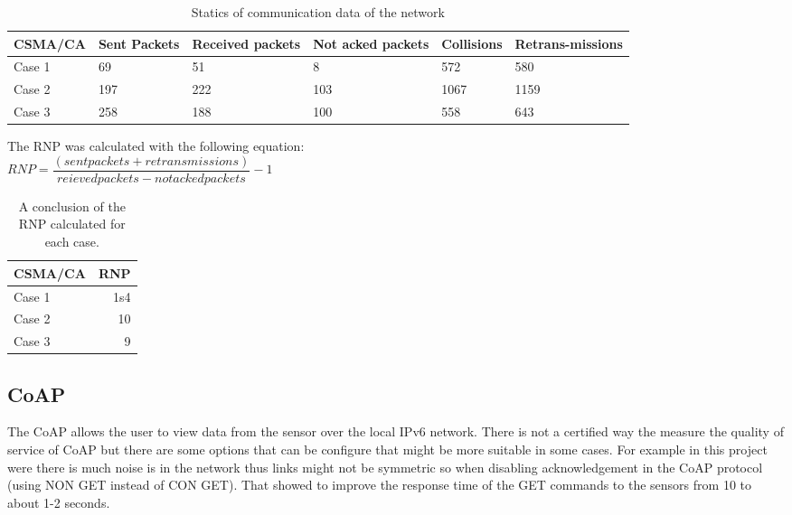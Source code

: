 \begin{table}[htbp]
	\caption{Statics of communication data of the network}
	\label{qos}
	\begin{center}
		\begin{tabular}{p{1cm}p{.9cm}p{1cm}p{1.2cm}p{1cm}p{1cm}}
			\hline
			CSMA/CA& Sent Packets & Received packets & Not acked packets & Collisions & Retrans-missions \\ \hline
			Case 1 & 69 & 51 & 8 & 572&580 \\ 
			Case 2 & 197 & 222 & 103 & 1067&1159 \\ 
			Case 3 & 258 & 188 & 100 & 558&643 \\ \hline
		\end{tabular}
	\end{center}
	
\end{table}
The RNP was calculated with the following equation:\\

$RNP = \dfrac{ (sent packets + retransmissions)}{reieved packets - not acked packets} -1 $

\begin{table}[htbp]
	\caption{A conclusion of the RNP calculated for each case.}
	\label{rnp}
	\begin{center}
		\begin{tabular}{lr}
			\hline
			CSMA/CA &RNP \\ \hline
			Case 1&1s4 \\ 
			Case 2&10 \\ 
			Case 3&9 \\ \hline
		\end{tabular}
	\end{center}
	
\end{table}


\subsection{CoAP}

The CoAP allows the user to view data from the sensor over the local IPv6 network. There is not a certified way the measure the quality of service of CoAP but there are some options that can be configure that might be more suitable in some cases. For example in this project were there is much noise is in the network thus links might not be symmetric so when disabling acknowledgement in the CoAP protocol (using NON GET instead of CON GET). That showed to improve the response time of the GET commands to the sensors from 10 to about 1-2 seconds.